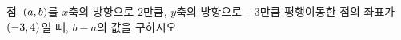점~$(a{,}\mkern3mu\mathopen{}b)$를 $x$축의 방향으로 $2$만큼, $y$축의 방향으로 $-3$만큼 평행이동한 점의 좌표가 $(-3{,}\mkern3mu\mathopen{}4)$일 때, $b-a$의 값을 구하시오.
